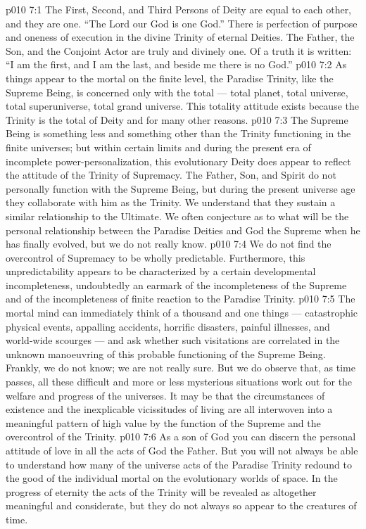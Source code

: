 \vs p010 7:1 The First, Second, and Third Persons of Deity are equal to each other, and they are one. “The Lord our God is one God.” There is perfection of purpose and oneness of execution in the divine Trinity of eternal Deities. The Father, the Son, and the Conjoint Actor are truly and divinely one. Of a truth it is written: “I am the first, and I am the last, and beside me there is no God.”
\vs p010 7:2 \pc As things appear to the mortal on the finite level, the Paradise Trinity, like the Supreme Being, is concerned only with the total --- total planet, total universe, total superuniverse, total grand universe. This totality attitude exists because the Trinity is the total of Deity and for many other reasons.
\vs p010 7:3 The Supreme Being is something less and something other than the Trinity functioning in the finite universes; but within certain limits and during the present era of incomplete power\hyp{}personalization, this evolutionary Deity does appear to reflect the attitude of the Trinity of Supremacy. The Father, Son, and Spirit do not personally function with the Supreme Being, but during the present universe age they collaborate with him as the Trinity. We understand that they sustain a similar relationship to the Ultimate. We often conjecture as to what will be the personal relationship between the Paradise Deities and God the Supreme when he has finally evolved, but we do not really know.
\vs p010 7:4 \pc We do not find the overcontrol of Supremacy to be wholly predictable. Furthermore, this unpredictability appears to be characterized by a certain developmental incompleteness, undoubtedly an earmark of the incompleteness of the Supreme and of the incompleteness of finite reaction to the Paradise Trinity.
\vs p010 7:5 The mortal mind can immediately think of a thousand and one things --- catastrophic physical events, appalling accidents, horrific disasters, painful illnesses, and world\hyp{}wide scourges --- and ask whether such visitations are correlated in the unknown manoeuvring of this probable functioning of the Supreme Being. Frankly, we do not know; we are not really sure. But we do observe that, as time passes, all these difficult and more or less mysterious situations  work out for the welfare and progress of the universes. It may be that the circumstances of existence and the inexplicable vicissitudes of living are all interwoven into a meaningful pattern of high value by the function of the Supreme and the overcontrol of the Trinity.
\vs p010 7:6 As a son of God you can discern the personal attitude of love in all the acts of God the Father. But you will not always be able to understand how many of the universe acts of the Paradise Trinity redound to the good of the individual mortal on the evolutionary worlds of space. In the progress of eternity the acts of the Trinity will be revealed as altogether meaningful and considerate, but they do not always so appear to the creatures of time.
